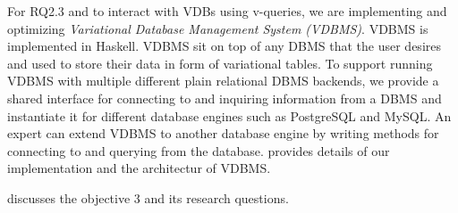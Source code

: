 For RQ2.3 and to interact with VDBs using v-queries, we are implementing
and optimizing
\emph{Variational Database Management System (VDBMS)}.
VDBMS is implemented in Haskell. VDBMS sit on 
top of any DBMS that the user desires and used to store their data 
in form of variational tables.
To support running VDBMS with multiple different plain relational DBMS backends,
we provide
a shared interface
for connecting to and inquiring information from a DBMS and
instantiate it for different database engines such as PostgreSQL and
MySQL. 
An expert can extend VDBMS to another database engine by
writing methods for connecting to and querying from the database.
 provides details of our implementation and the architectur of 
VDBMS.

 discusses the objective 3 and its research questions.






